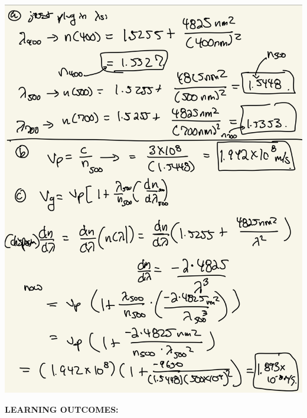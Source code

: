 \documentclass[10pt]{article}
\begin{document}
\begin{center}
    \includegraphics*[scale = .25]{imgs/example-with-phase-and-group.jpeg}
\end{center}
\newpage 
\textbf{LEARNING OUTCOMES:} \\ 
\fbox
\end{document}
